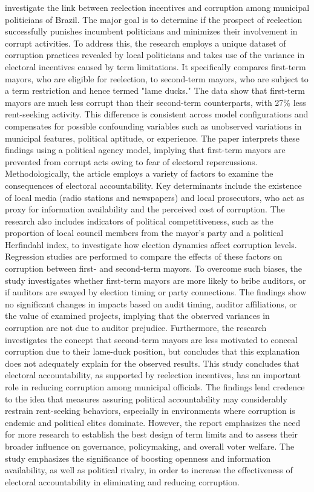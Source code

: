  investigate the link between reelection incentives and corruption among municipal politicians of Brazil. The major goal is to determine if the prospect of reelection successfully punishes incumbent politicians and minimizes their involvement in corrupt activities. To address this, the research employs a unique dataset of corruption practices revealed by local politicians and takes use of the variance in electoral incentives caused by term limitations. It specifically compares first-term mayors, who are eligible for reelection, to second-term mayors, who are subject to a term restriction and hence termed "lame ducks." The data show that first-term mayors are much less corrupt than their second-term counterparts, with 27\% less rent-seeking activity. This difference is consistent across model configurations and compensates for possible confounding variables such as unobserved variations in municipal features, political aptitude, or experience. The paper interprets these findings using a political agency model, implying that first-term mayors are prevented from corrupt acts owing to fear of electoral repercussions. Methodologically, the article employs a variety of factors to examine the consequences of electoral accountability. Key determinants include the existence of local media (radio stations and newspapers) and local prosecutors, who act as proxy for information availability and the perceived cost of corruption. The research also includes indicators of political competitiveness, such as the proportion of local council members from the mayor's party and a political Herfindahl index, to investigate how election dynamics affect corruption levels. Regression studies are performed to compare the effects of these factors on corruption between first- and second-term mayors. To overcome such biases, the study investigates whether first-term mayors are more likely to bribe auditors, or if auditors are swayed by election timing or party connections. The findings show no significant changes in impacts based on audit timing, auditor affiliations, or the value of examined projects, implying that the observed variances in corruption are not due to auditor prejudice. Furthermore, the research investigates the concept that second-term mayors are less motivated to conceal corruption due to their lame-duck position, but concludes that this explanation does not adequately explain for the observed results. This study concludes that electoral accountability, as supported by reelection incentives, has an important role in reducing corruption among municipal officials. The findings lend credence to the idea that measures assuring political accountability may considerably restrain rent-seeking behaviors, especially in environments where corruption is endemic and political elites dominate. However, the report emphasizes the need for more research to establish the best design of term limits and to assess their broader influence on governance, policymaking, and overall voter welfare. The study emphasizes the significance of boosting openness and information availability, as well as political rivalry, in order to increase the effectiveness of electoral accountability in eliminating and reducing corruption. \par
